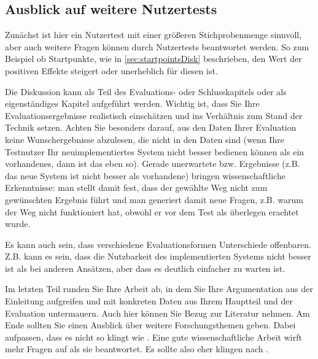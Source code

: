 \subsection{Ausblick auf weitere Nutzertests}
Zunächst ist hier ein Nutzertest mit einer größeren Stichprobenmenge sinnvoll, aber auch weitere Fragen können durch Nutzertests beantwortet werden. So zum Beispiel ob Startpunkte, wie in \ref{sec:startpointsDisk} beschrieben, den Wert der positiven Effekte steigert oder unerheblich für diesen ist.
\cite{thorstennagel2015}


Die Diskussion kann als Teil des Evaluations- oder Schlusskapitels oder als eigenständiges Kapitel aufgeführt werden. Wichtig ist, dass Sie Ihre Evaluationsergebnisse realistisch einschätzen und ins Verhältnis zum Stand der Technik setzen. Achten Sie besonders darauf, aus den Daten Ihrer Evaluation keine Wunschergebnisse abzulesen, die nicht in den Daten sind (wenn Ihre Testnutzer Ihr neuimplementiertes System nicht besser bedienen können als ein vorhandenes, dann ist das eben so). Gerade unerwartete bzw.  Ergebnisse (z.B. das neue System ist nicht besser als vorhandene) bringen wissenschaftliche Erkenntnisse: man stellt damit fest, dass der gewählte Weg nicht zum gewünschten Ergebnis führt und man generiert damit neue Fragen, z.B. warum der Weg nicht funktioniert hat, obwohl er vor dem Test als überlegen erachtet wurde.

Es kann auch sein, dass verschiedene Evaluationsformen Unterschiede offenbaren. Z.B. kann es sein, dass die Nutzbarkeit des implementierten Systems nicht besser ist als bei anderen Ansätzen, aber dass es deutlich einfacher zu warten ist.


Im letzten Teil runden Sie Ihre Arbeit ab, in dem Sie Ihre Argumentation aus der Einleitung aufgreifen und mit konkreten Daten aus Ihrem Hauptteil und der Evaluation untermauern. Auch hier können Sie Bezug zur Literatur nehmen. Am Ende sollten Sie einen Ausblick über weitere Forschungsthemen geben. Dabei aufpassen, dass es nicht so klingt wie . Eine gute wissenschaftliche Arbeit wirft mehr Fragen auf als sie beantwortet. Es sollte also eher klingen nach .